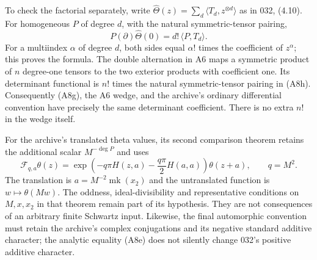 \documentclass[11pt]{article}
\theoremstyle{definition}\newtheorem{definition}[theorem]{Definition}\newtheorem{remark}[theorem]{Remark}
\begin{document}
To check the factorial separately, write
$\widehat\Theta(z)=\sum_d\langle T_d,z^{\otimes d}\rangle$
as in 032, (4.10).  For homogeneous $P$ of degree $d$, with the
natural symmetric-tensor pairing,
\[
          P(\partial)\widehat\Theta(0)
                 =d!\,\langle P,T_d\rangle.
 \tag{A8h}
\]
For a multiindex $\alpha$ of degree $d$, both sides equal
$\alpha!$ times the coefficient of $z^\alpha$; this proves the
formula.  The double alternation in A6 maps a symmetric product
of $n$ degree-one tensors to the two exterior products with
coefficient one.  Its determinant functional is $n!$ times the
natural symmetric-tensor pairing in (A8h).  Consequently (A8g),
the A6 wedge, and the archive's ordinary differential convention
have precisely the same determinant coefficient.  There is no
extra $n!$ in the wedge itself.

For the archive's translated theta values, its second comparison
theorem retains the additional scalar $M^{-\deg P}$ and uses
\[
 \mathcal F_{q,a}\theta(z)
   =\exp\left(-q\pi H(z,a)-\frac{q\pi}{2}H(a,a)\right)
       \theta(z+a),\qquad q=M^2.
 \tag{A8i}
\]
The translation is $a=M^{-2}\operatorname{mk}(x_2)$ and the
untranslated function is $w\mapsto\theta(Mw)$.  The oddness,
ideal-divisibility and representative conditions on $M,x,x_2$ in
that theorem remain part of its hypothesis.  They are not
consequences of an arbitrary finite Schwartz input.  Likewise,
the final automorphic convention must retain the archive's
complex conjugations and its negative standard additive
character; the analytic equality (A8e) does not silently change
032's positive additive character.
\end{document}
